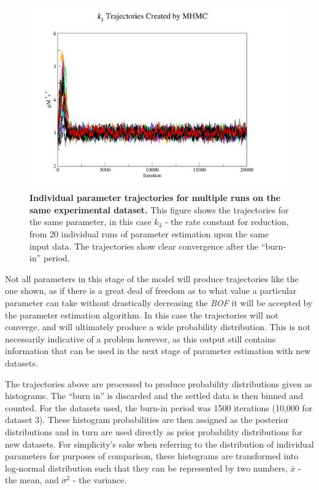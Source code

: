 \begin{figure}[p]
 \centering
 \includegraphics[width=14cm, trim=75px 50px 125px 25px]{./05-oxygenreduction/data/k3s1.pdf}
 \caption[Individual parameter trajectories for multiple runs on the same experimental dataset]{{\bf Individual parameter trajectories for multiple runs on the same experimental dataset.} This figure shows the trajectories for the same parameter, in this case $k_3$ - the rate constant for \cbbthree{} reduction, from 20 individual runs of parameter estimation upon the same input data. The trajectories show clear convergence after the ``burn-in'' period.
 \label{fig:k3s}}
\end{figure}
\afterpage{\clearpage}

Not all parameters in this stage of the model will produce trajectories like the one shown, as if there is a great deal of freedom as to what value a particular parameter can take without drastically decreasing the \textit{BOF} it will be accepted by the parameter estimation algorithm. In this case the trajectories will not converge, and will ultimately produce a wide probability distribution. This is not necessarily indicative of a problem however, as this output still contains information that can be used in the next stage of parameter estimation with new datasets.

The trajectories above are processed to produce probability distributions given as histograms. The ``burn in'' is discarded and the settled data is then binned and counted. For the datasets used, the burn-in period was 1500 iterations (10,000 for dataset 3). These histogram probabilities are then assigned as the posterior distributions and in turn are used directly as prior probability distributions for new datasets. For simplicity's sake when referring to the distribution of individual parameters for purposes of comparison, these histograms are transformed into log-normal distribution such that they can be represented by two numbers, $\bar{x}$ - the mean, and $\sigma^2$ - the variance.

